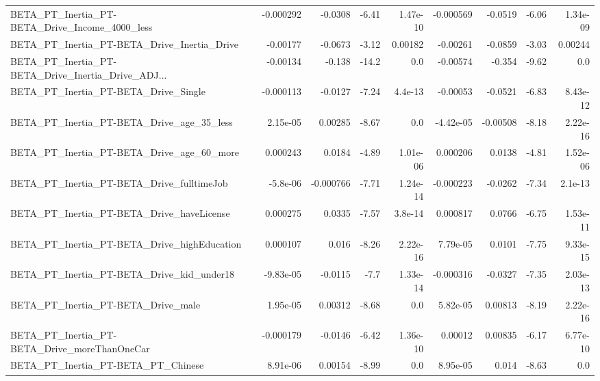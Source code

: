 \begin{tabular}{lrrrrrrrr}
BETA\_PT\_Inertia\_PT-BETA\_Drive\_Income\_4000\_less     &   -0.000292 &      -0.0308 &    -6.41 & 1.47e-10 &  -0.000569 &     -0.0519 &        -6.06 &      1.34e-09 \\
BETA\_PT\_Inertia\_PT-BETA\_Drive\_Inertia\_Drive        &    -0.00177 &      -0.0673 &    -3.12 &  0.00182 &   -0.00261 &     -0.0859 &        -3.03 &       0.00244 \\
BETA\_PT\_Inertia\_PT-BETA\_Drive\_Inertia\_Drive\_ADJ... &    -0.00134 &       -0.138 &    -14.2 &      0.0 &   -0.00574 &      -0.354 &        -9.62 &           0.0 \\
BETA\_PT\_Inertia\_PT-BETA\_Drive\_Single               &   -0.000113 &      -0.0127 &    -7.24 &  4.4e-13 &   -0.00053 &     -0.0521 &        -6.83 &      8.43e-12 \\
BETA\_PT\_Inertia\_PT-BETA\_Drive\_age\_35\_less          &    2.15e-05 &      0.00285 &    -8.67 &      0.0 &  -4.42e-05 &    -0.00508 &        -8.18 &      2.22e-16 \\
BETA\_PT\_Inertia\_PT-BETA\_Drive\_age\_60\_more          &    0.000243 &       0.0184 &    -4.89 & 1.01e-06 &   0.000206 &      0.0138 &        -4.81 &      1.52e-06 \\
BETA\_PT\_Inertia\_PT-BETA\_Drive\_fulltimeJob          &    -5.8e-06 &    -0.000766 &    -7.71 & 1.24e-14 &  -0.000223 &     -0.0262 &        -7.34 &       2.1e-13 \\
BETA\_PT\_Inertia\_PT-BETA\_Drive\_haveLicense          &    0.000275 &       0.0335 &    -7.57 &  3.8e-14 &   0.000817 &      0.0766 &        -6.75 &      1.53e-11 \\
BETA\_PT\_Inertia\_PT-BETA\_Drive\_highEducation        &    0.000107 &        0.016 &    -8.26 & 2.22e-16 &   7.79e-05 &      0.0101 &        -7.75 &      9.33e-15 \\
BETA\_PT\_Inertia\_PT-BETA\_Drive\_kid\_under18          &   -9.83e-05 &      -0.0115 &     -7.7 & 1.33e-14 &  -0.000316 &     -0.0327 &        -7.35 &      2.03e-13 \\
BETA\_PT\_Inertia\_PT-BETA\_Drive\_male                 &    1.95e-05 &      0.00312 &    -8.68 &      0.0 &   5.82e-05 &     0.00813 &        -8.19 &      2.22e-16 \\
BETA\_PT\_Inertia\_PT-BETA\_Drive\_moreThanOneCar       &   -0.000179 &      -0.0146 &    -6.42 & 1.36e-10 &    0.00012 &     0.00835 &        -6.17 &      6.77e-10 \\
BETA\_PT\_Inertia\_PT-BETA\_PT\_Chinese                 &    8.91e-06 &      0.00154 &    -8.99 &      0.0 &   8.95e-05 &       0.014 &        -8.63 &           0.0 \\

\end{tabular}
